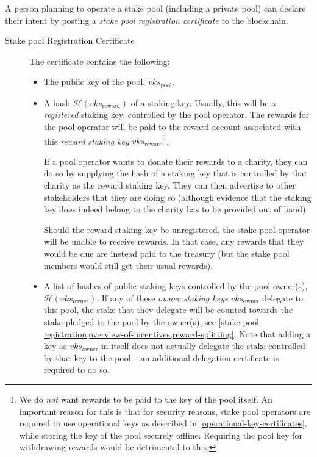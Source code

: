 \documentclass[11pt,a4paper]{article}
\begin{document}
A person planning to operate a stake pool (including a private pool) can
declare their intent by posting a \emph{stake pool registration certificate} to
the blockchain.

\begin{description}
\item[Stake pool Registration Certificate]
The certificate contains the following:

\begin{itemize}
\item
  The public key of the pool, \(vks_\text{pool}\).

\item
  A hash \(\mathcal{H}(vks_\text{reward})\) of a staking key. Usually, this will
  be a \emph{registered} staking key, controlled by the pool operator. The
  rewards for the pool operator will be paid to the reward account associated
  with this \emph{reward staking key} \(vks_\text{reward}\)\footnote{We do
    \emph{not} want rewards to be paid to the key of the pool itself. An
    important reason for this is that for security reasons, stake pool
    operators are required to use operational keys as described in
    \cref{operational-key-certificates}, while storing the key of the pool
    securely offline. Requiring the pool key for withdrawing rewards would be
    detrimental to this.}.

  If a pool operator wants to donate their rewards to a charity, they can do so
  by supplying the hash of a staking key that is controlled by that charity as
  the reward staking key. They can then advertise to other stakeholders that
  they are doing so (although evidence that the staking key does indeed belong
  to the charity has to be provided out of band).

  Should the reward staking key be unregistered, the stake pool operator will be
  unable to receive rewards. In that case, any rewards that they would be due
  are instead paid to the treasury (but the stake pool members would still get
  their usual rewards).

\item
  A list of hashes of public staking keys controlled by the pool owner(s),
  \(\mathcal{H}(vks_\text{owner})\). If any of these \emph{owner staking keys}
  \(vks_\text{owner}\) delegate to this pool, the stake that they delegate will
  be counted towards the stake pledged to the pool by the owner(s), see
  \cref{stake-pool-registration,overview-of-incentives,reward-splitting}. Note
  that adding a key as \(vks_\text{owner}\) in itself does not actually delegate
  the stake controlled by that key to the pool -- an additional delegation
  certificate is required to do so.


\end{itemize}
\end{description}
\end{document}
